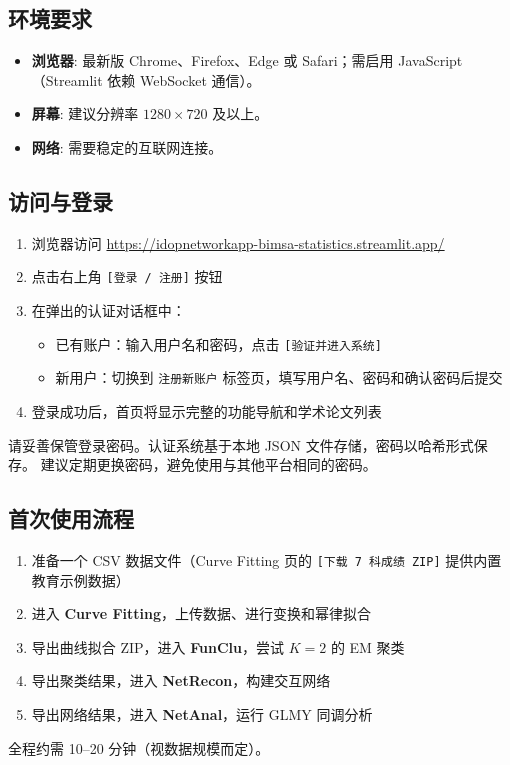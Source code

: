 \documentclass[12pt,a4paper]{ctexart}
\newcommand{\btn}[1]{\texttt{[#1]}}
\newcommand{\tab}[1]{\texttt{#1}}
\newcommand{\uielem}[1]{\textbf{#1}}
\begin{document}
\subsection{环境要求}

\begin{itemize}[leftmargin=*]
    \item \textbf{浏览器}: 最新版 Chrome、Firefox、Edge 或 Safari；需启用 JavaScript（Streamlit 依赖 WebSocket 通信）。
    \item \textbf{屏幕}: 建议分辨率 $1280 \times 720$ 及以上。
    \item \textbf{网络}: 需要稳定的互联网连接。
\end{itemize}

\subsection{访问与登录}

\begin{enumerate}[leftmargin=*]
    \item 浏览器访问 \url{https://idopnetworkapp-bimsa-statistics.streamlit.app/}
    \item 点击右上角 \btn{登录 / 注册} 按钮
    \item 在弹出的认证对话框中：
    \begin{itemize}
        \item 已有账户：输入用户名和密码，点击 \btn{验证并进入系统}
        \item 新用户：切换到 \tab{注册新账户} 标签页，填写用户名、密码和确认密码后提交
    \end{itemize}
    \item 登录成功后，首页将显示完整的功能导航和学术论文列表
\end{enumerate}

\begin{warnbox}[安全提示]
    请妥善保管登录密码。认证系统基于本地 JSON 文件存储，密码以哈希形式保存。
    建议定期更换密码，避免使用与其他平台相同的密码。
\end{warnbox}

\subsection{首次使用流程}

\begin{stepbox}[推荐入门路径]
    \begin{enumerate}[leftmargin=*]
        \item 准备一个 CSV 数据文件（Curve Fitting 页的 \btn{下载 7 科成绩 ZIP} 提供内置教育示例数据）
        \item 进入 \uielem{Curve Fitting}，上传数据、进行变换和幂律拟合
        \item 导出曲线拟合 ZIP，进入 \uielem{FunClu}，尝试 $K = 2$ 的 EM 聚类
        \item 导出聚类结果，进入 \uielem{NetRecon}，构建交互网络
        \item 导出网络结果，进入 \uielem{NetAnal}，运行 GLMY 同调分析
    \end{enumerate}
    全程约需 10--20 分钟（视数据规模而定）。
\end{stepbox}
\end{document}

